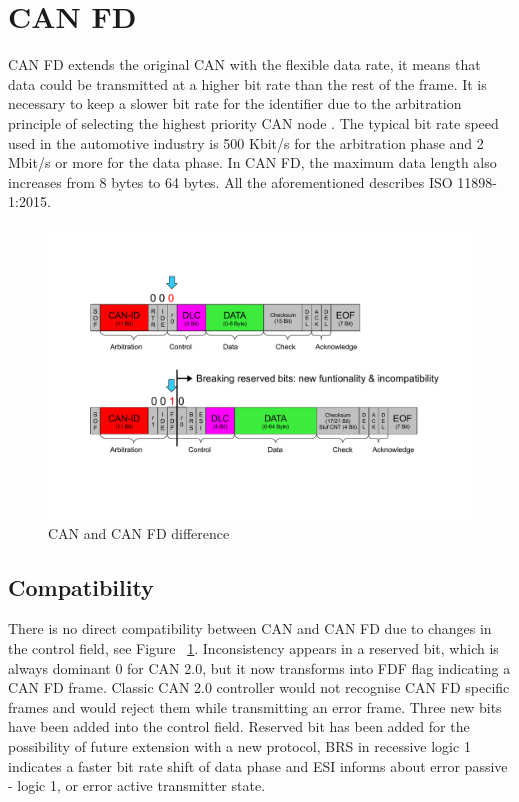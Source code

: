 \documentclass{ctuthesis}
\begin{document}
 \section{CAN FD}
  CAN FD extends the original CAN with the flexible data rate, it means that data could be transmitted at a higher bit rate than the rest of the frame. It is necessary to keep a slower bit rate for the identifier due to the arbitration principle of selecting the highest priority CAN node \cite{priority_can}. The typical bit rate speed used in the automotive industry is 500 Kbit/s for the arbitration phase and 2 Mbit/s or more for the data phase. In CAN FD, the maximum data length also increases from 8 bytes to 64 bytes. All the aforementioned describes ISO 11898-1:2015.
  \begin{figure}[H]
  \includegraphics[width=1\textwidth]{agl2017-socketcan-can_fd}
  \caption{CAN and CAN FD difference \cite{canfd}}
  \label{fig:cancanfddifference}
  \end{figure}
  \subsection{Compatibility}
  \label{section:combability}
   There is no direct compatibility between CAN and CAN FD due to changes in the control field, see Figure ~\ref{fig:cancanfddifference}. Inconsistency appears in a reserved bit, which is always dominant 0 for CAN 2.0, but it now transforms into FDF flag indicating a CAN FD frame. Classic CAN 2.0 controller would not recognise CAN FD specific frames and would reject them while transmitting an error frame. Three new bits have been added into the control field. Reserved bit has been added for the possibility of future extension with a new protocol, BRS in recessive logic 1 indicates a faster bit rate shift of data phase and ESI informs about error passive - logic 1, or error active transmitter state.
\end{document}
